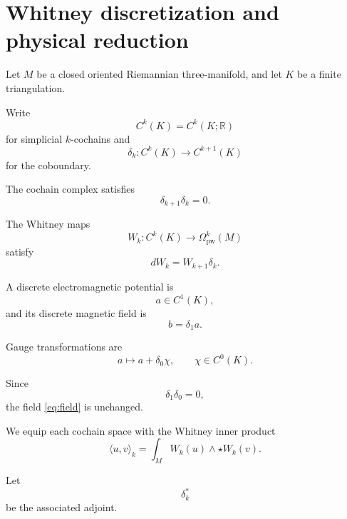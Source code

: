 \documentclass[11pt]{article}
\theoremstyle{remark}
\newcommand{\R}{\mathbb{R}}
\begin{document}
\section{Whitney discretization and physical reduction}

Let \(M\) be a closed oriented Riemannian three-manifold, and let
\(K\) be a finite triangulation.

Write
\begin{equation}
C^k(K)
=
C^k(K;\R)
\end{equation}
for simplicial \(k\)-cochains and
\begin{equation}
\delta_k:
C^k(K)\longrightarrow C^{k+1}(K)
\end{equation}
for the coboundary.

The cochain complex satisfies
\begin{equation}
\delta_{k+1}\delta_k=0.
\label{eq:delta-square}
\end{equation}

The Whitney maps
\begin{equation}
W_k:
C^k(K)\longrightarrow\Omega^k_{\mathrm{pw}}(M)
\end{equation}
satisfy
\begin{equation}
dW_k=W_{k+1}\delta_k.
\label{eq:whitney}
\end{equation}

A discrete electromagnetic potential is
\begin{equation}
a\in C^1(K),
\end{equation}
and its discrete magnetic field is
\begin{equation}
b=\delta_1a.
\label{eq:field}
\end{equation}

Gauge transformations are
\begin{equation}
a\longmapsto a+\delta_0\chi,
\qquad
\chi\in C^0(K).
\label{eq:gauge}
\end{equation}

Since
\begin{equation}
\delta_1\delta_0=0,
\end{equation}
the field \eqref{eq:field} is unchanged.

We equip each cochain space with the Whitney inner product
\begin{equation}
\langle u,v\rangle_k
=
\int_M
W_k(u)\wedge\star W_k(v).
\label{eq:whitney-inner}
\end{equation}

Let
\begin{equation}
\delta_k^\ast
\end{equation}
be the associated adjoint.
\end{document}
